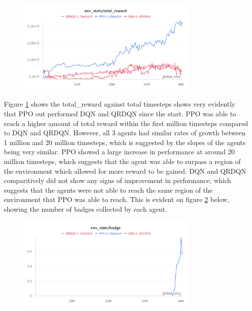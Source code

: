 \begin{figure}[H]
    \centering
    \includegraphics[width=0.8\textwidth]{figures/all_step_total_reward.png}
    \caption{}
    \label{fig:agent_eval_all_reward}
\end{figure}

Figure \ref{fig:agent_eval_all_reward} shows the total\_reward against total timesteps shows very evidently that PPO out performed DQN and QRDQN since the start. PPO was able to reach a higher amount of total reward within the first million timesteps compared to DQN and QRDQN. However, all 3 agents had similar rates of growth between 1 million and 20 million timesteps, which is suggested by the slopes of the agents being very similar. PPO showed a large increase in performance at around 20 million timesteps, which suggests that the agent was able to surpass a region of the environment which allowed for more reward to be gained. DQN and QRDQN comparitively did not show any signs of improvement in performance, which suggests that the agents were not able to reach the same region of the environment that PPO was able to reach. This is evident on figure \ref{fig:agent_eval_all_badge} below, showing the number of badges collected by each agent.

\begin{figure}[H]
    \centering
    \includegraphics[width=0.8\textwidth]{figures/all_step_badge.png}
    \caption{}
    \label{fig:agent_eval_all_badge}
\end{figure}

